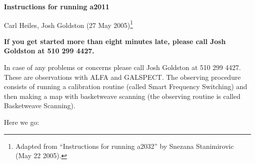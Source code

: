 \setlength{\textheight}{21.5cm}
\setlength{\textwidth}{7in}
\setlength{\topmargin}{-0.25in}
\setlength{\oddsidemargin}{-0.25in}
\setlength{\evensidemargin}{0mm}
\setlength{\parindent}{0em}
\setlength{\headsep}{10.0mm}

\def\baselinestretch{1.0}
\pagestyle{myheadings}
\def\kms{km~s$^{-1}$}


\parskip 5pt
\begin{center}
  {\Large \bf Instructions for running a2011}

\vspace{0.5cm} {\large Carl Heiles, Josh Goldston 
(27 May 2005)\footnote{Adapted from
``Instructions for running a2032'' by Snezana Stanimirovic (May 22 2005).}}
\end{center}

{\bf If you get started more than eight minutes late, please call Josh
Goldston at 510 299 4427.}

In case of any problems or concerns please call Josh Goldston at 510 299
4427.  These are observations with ALFA and GALSPECT.  The observing
procedure consists of running a calibration routine (called Smart
Frequency Switching) and then making a map with basketweave scanning
(the observing routine is called Basketweave Scanning). 

Here we go:

